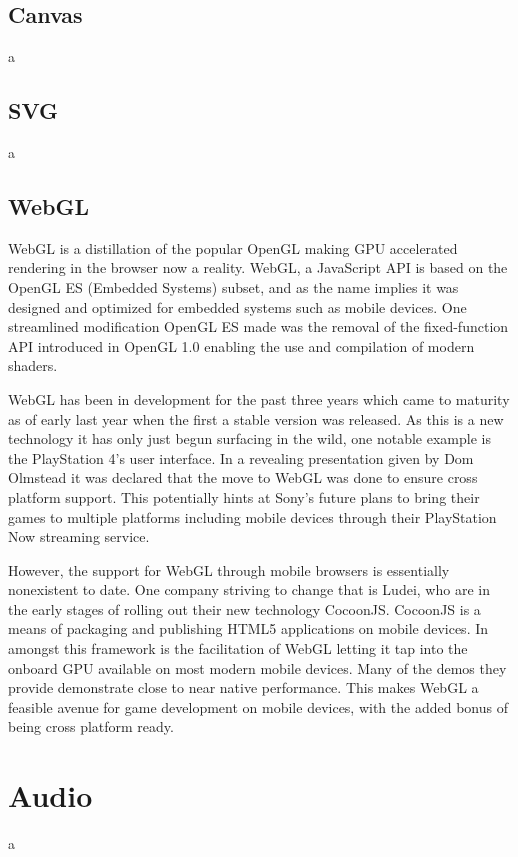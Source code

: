 \documentclass[final]{cmpreport}
\begin{document}
\subsection{Canvas}
a

\subsection{SVG}
a

\subsection{WebGL}
WebGL is a distillation of the popular OpenGL making GPU accelerated rendering in the browser now a reality. WebGL, a JavaScript API is based on the OpenGL ES (Embedded Systems) subset, and as the name implies it was designed and optimized for embedded systems such as mobile devices. One streamlined modification OpenGL ES made was the removal of the fixed-function API introduced in OpenGL 1.0 enabling the use and compilation of modern shaders.

WebGL has been in development for the past three years which came to maturity as of early last year when the first a stable version was released. As this is a new technology it has only just begun surfacing in the wild, one notable example is the PlayStation 4's user interface. In a revealing presentation given by Dom Olmstead it was declared that the move to WebGL was done to ensure cross platform support. This potentially hints at Sony's future plans to bring their games to multiple platforms including mobile devices through their PlayStation Now streaming service.

However, the support for WebGL through mobile browsers is essentially nonexistent to date. One company striving to change that is Ludei, who are in the early stages of rolling out their new technology CocoonJS. CocoonJS is a means of packaging and publishing HTML5 applications on mobile devices. In amongst this framework is the facilitation of WebGL letting it tap into the onboard GPU available on most modern mobile devices. Many of the demos they provide demonstrate close to near native performance. This makes WebGL a feasible avenue for game development on mobile devices, with the added bonus of being cross platform ready.

\section{Audio}
a
\end{document}
